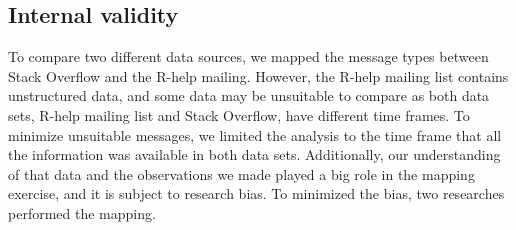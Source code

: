 \documentclass{sig-alternate-05-2015}
\begin{document}
\subsection{Internal validity}


To compare two different data sources, we mapped the message types between Stack Overflow and the R-help mailing.
However, the R-help mailing list contains unstructured data, and some data may be unsuitable to compare as both data sets, R-help mailing list and Stack Overflow, have different time frames.
To minimize unsuitable messages, we limited the analysis to the time frame that all the information was available in both data sets.
Additionally, our understanding of that data and the observations we made played a big role in the mapping exercise, and it is subject to research bias.
To minimized the bias, two researches performed the mapping.


\end{document}
